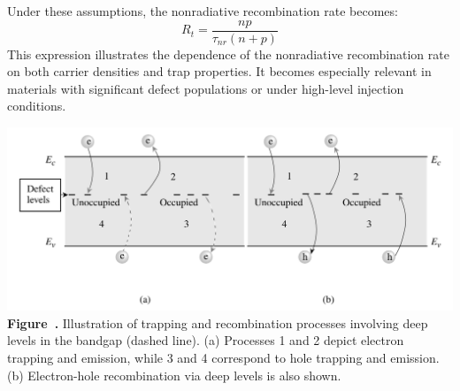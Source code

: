 Under these assumptions, the nonradiative recombination rate becomes:
\begin{equation}
	R_t = \frac{np}{\tau_{nr}(n + p)}
\end{equation}
This expression illustrates the dependence of the nonradiative recombination rate on both carrier densities and trap properties. It becomes especially relevant in materials with significant defect populations or under high-level injection conditions.
\begin{center}
	\begin{minipage}{0.80\textwidth}
		\centering
		\includegraphics[width=\textwidth]{img/Recombination.png}
		\\[0.5em]
		\textbf{Figure~\thefigure.} Illustration of trapping and recombination processes involving deep levels in the bandgap (dashed line).
		(a) Processes 1 and 2 depict electron trapping and emission, while 3 and 4 correspond to hole trapping and emission.
		(b) Electron-hole recombination via deep levels is also shown.
		\label{fig:Recombination}
	\end{minipage}
\end{center}

